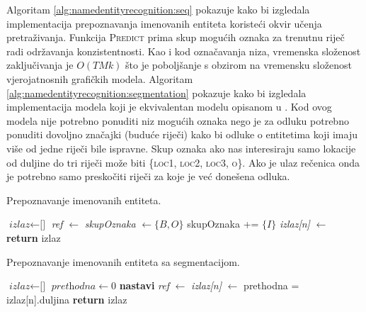 Algoritam \ref{alg:namedentityrecognition:seq} pokazuje kako bi izgledala
implementacija prepoznavanja imenovanih entiteta koristeći okvir učenja
pretraživanja. Funkcija \textsc{Predict} prima skup mogućih oznaka za trenutnu
riječ radi održavanja konzistentnosti. Kao i kod označavanja niza, vremenska
složenost zaključivanja je $O(T M k)$ što je poboljšanje s obzirom na vremensku
složenost vjerojatnosnih grafičkih modela. Algoritam
\ref{alg:namedentityrecognition:segmentation} pokazuje kako bi izgledala
implementacija modela koji je ekvivalentan modelu opisanom u
\citep{sarawagi2004semi}. Kod ovog modela nije potrebno ponuditi niz mogućih
oznaka nego je za odluku potrebno ponuditi dovoljno značajki (buduće riječi)
kako bi odluke o entitetima koji imaju više od jedne riječi bile ispravne. Skup
oznaka ako nas interesiraju samo lokacije od duljine do tri riječi može biti
\{\textsc{loc1}, \textsc{loc2}, \textsc{loc3}, \textsc{o}\}. Ako je ulaz
rečenica onda je potrebno samo preskočiti riječi za koje je već donešena odluka.

\begin{algorithm}[H]
\caption{Prepoznavanje imenovanih entiteta.}
\label{alg:namedentityrecognition:seq}
\begin{algorithmic}[1]
\State $\textit{izlaz} \gets \text{[]}$
  \State \textit{ref} $\gets$ 
  \State \textit{skupOznaka} $\gets \{B,O\}$
    \State skupOznaka += $\{I\}$
  \EndIf
  \State \textit{izlaz[n]} $\gets$ 
\EndFor
\State {}
\State \textbf{return} izlaz
\EndFunction
\end{algorithmic}
\end{algorithm}

\begin{algorithm}[H]
\caption{Prepoznavanje imenovanih entiteta sa segmentacijom.}
\label{alg:namedentityrecognition:segmentation}
\begin{algorithmic}[1]
\State $\textit{izlaz} \gets \text{[]}$
\State $\textit{prethodna} \gets 0$
    \State \textbf{nastavi} 
  \EndIf
  \State \textit{ref} $\gets$ 
  \State \textit{izlaz[n]} $\gets$ 
  \State prethodna = izlaz[n].duljina
\EndFor
\State {}
\State \textbf{return} izlaz
\EndFunction
\end{algorithmic}
\end{algorithm}
